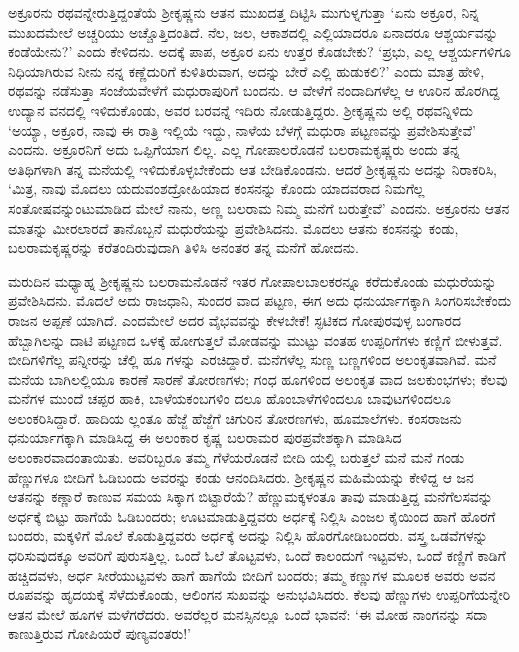 ಅಕ್ರೂರನು ರಥವನ್ನೇರುತ್ತಿದ್ದಂತೆಯೆ ಶ್ರೀಕೃಷ್ಣನು ಆತನ ಮುಖದತ್ತ ದಿಟ್ಟಿಸಿ ಮುಗುಳ್ನಗುತ್ತಾ ‘ಏನು ಅಕ್ರೂರ, ನಿನ್ನ ಮುಖದಮೇಲೆ ಅಚ್ಚರಿಯು ಅಚ್ಚೊತ್ತಿದಂತಿದೆ. ನೆಲ, ಜಲ, ಆಕಾಶದಲ್ಲಿ ಎಲ್ಲಿಯಾದರೂ ಏನಾದರೂ ಆಶ್ಚರ್ಯವನ್ನು ಕಂಡೆಯೇನು?’ ಎಂದು ಕೇಳಿದನು. ಅದಕ್ಕೆ ಪಾಪ, ಅಕ್ರೂರ ಏನು ಉತ್ತರ ಕೊಡಬೇಕು? ‘ಪ್ರಭು, ಎಲ್ಲ ಆಶ್ಚರ್ಯಗಳಿಗೂ ನಿಧಿಯಾಗಿರುವ ನೀನು ನನ್ನ ಕಣ್ಣೆದುರಿಗೆ ಕುಳಿತಿರುವಾಗ, ಅದನ್ನು ಬೇರೆ ಎಲ್ಲಿ ಹುಡುಕಲಿ?’ ಎಂದು ಮಾತ್ರ ಹೇಳಿ, ರಥವನ್ನು ನಡೆಸುತ್ತಾ ಸಂಜೆಯವೇಳೆಗೆ ಮಧುರಾಪುರಿಗೆ ಬಂದನು. ಆ ವೇಳೆಗೆ ನಂದಾದಿಗಳೆಲ್ಲ ಆ ಊರಿನ ಹೊರಗಿದ್ದ ಉದ್ಯಾನ ವನದಲ್ಲಿ ಇಳಿದುಕೊಂಡು, ಅವರ ಬರವನ್ನೆ ಇದಿರು ನೋಡುತ್ತಿದ್ದರು. ಶ್ರೀಕೃಷ್ಣನು ಅಲ್ಲಿ ರಥವನ್ನಿಳಿದು ‘ಅಯ್ಯಾ, ಅಕ್ರೂರ, ನಾವು ಈ ರಾತ್ರಿ ಇಲ್ಲಿಯೆ ಇದ್ದು, ನಾಳೆಯ ಬೆಳಗ್ಗೆ ಮಧುರಾ ಪಟ್ಟಣವನ್ನು ಪ್ರವೇಶಿಸುತ್ತೇವೆ’ ಎಂದನು. ಅಕ್ರೂರನಿಗೆ ಅದು ಒಪ್ಪಿಗೆಯಾಗ ಲಿಲ್ಲ. ಎಲ್ಲ ಗೋಪಾಲರೊಡನೆ ಬಲರಾಮಕೃಷ್ಣರು ಅಂದು ತನ್ನ ಅತಿಥಿಗಳಾಗಿ ತನ್ನ ಮನೆಯಲ್ಲಿ ಇಳಿದುಕೊಳ್ಳಬೇಕೆಂದು ಆತ ಬೇಡಿಕೊಂಡನು. ಆದರೆ ಶ್ರೀಕೃಷ್ಣನು ಅದನ್ನು ನಿರಾಕರಿಸಿ, ‘ಮಿತ್ರ, ನಾವು ಮೊದಲು ಯದುವಂಶದ್ರೋಹಿಯಾದ ಕಂಸನನ್ನು ಕೊಂದು ಯಾದವರಾದ ನಿಮಗೆಲ್ಲ ಸಂತೋಷವನ್ನುಂಟುಮಾಡಿದ ಮೇಲೆ ನಾನು, ಅಣ್ಣ ಬಲರಾಮ ನಿಮ್ಮ ಮನೆಗೆ ಬರುತ್ತೇವೆ’ ಎಂದನು. ಅಕ್ರೂರನು ಆತನ ಮಾತನ್ನು ಮೀರಲಾರದೆ ತಾನೊಬ್ಬನೆ ಮಧುರೆಯನ್ನು ಪ್ರವೇಶಿಸಿದನು. ಮೊದಲು ಆತನು ಕಂಸನನ್ನು ಕಂಡು, ಬಲರಾಮಕೃಷ್ಣರನ್ನು ಕರೆತಂದಿರುವುದಾಗಿ ತಿಳಿಸಿ ಅನಂತರ ತನ್ನ ಮನೆಗೆ ಹೋದನು.

ಮರುದಿನ ಮಧ್ಯಾಹ್ನ ಶ್ರೀಕೃಷ್ಣನು ಬಲರಾಮನೊಡನೆ ಇತರ ಗೋಪಾಲಬಾಲಕರನ್ನೂ ಕರೆದುಕೊಂಡು ಮಧುರೆಯನ್ನು ಪ್ರವೇಶಿಸಿದನು. ಮೊದಲೆ ಅದು ರಾಜಧಾನಿ, ಸುಂದರ ವಾದ ಪಟ್ಟಣ, ಈಗ ಅದು ಧನುರ್ಯಾಗಕ್ಕಾಗಿ ಸಿಂಗರಿಸಬೇಕೆಂದು ರಾಜನ ಅಪ್ಪಣೆ ಯಾಗಿದೆ. ಎಂದಮೇಲೆ ಅದರ ವೈಭವವನ್ನು ಕೇಳಬೇಕೆ! ಸ್ಫಟಿಕದ ಗೋಪುರವುಳ್ಳ ಬಂಗಾರದ ಹೆಬ್ಬಾಗಿಲನ್ನು ದಾಟಿ ಪಟ್ಟಣದ ಒಳಕ್ಕೆ ಹೋಗುತ್ತಲೆ ಮೋಡವನ್ನು ಮುಟ್ಟು ವಂತಹ ಉಪ್ಪರಿಗೆಗಳು ಕಣ್ಣಿಗೆ ಬೀಳುತ್ತವೆ. ಬೀದಿಗಳಿಗೆಲ್ಲ ಪನ್ನೀರನ್ನು ಚೆಲ್ಲಿ ಹೂ ಗಳನ್ನು ಎರಚಿದ್ದಾರೆ. ಮನೆಗಳೆಲ್ಲ ಸುಣ್ಣ ಬಣ್ಣಗಳಿಂದ ಅಲಂಕೃತವಾಗಿವೆ. ಮನೆ ಮನೆಯ ಬಾಗಿಲಲ್ಲಿಯೂ ಕಾರಣೆ ಸಾರಣೆ ತೋರಣಗಳು; ಗಂಧ ಹೂಗಳಿಂದ ಅಲಂಕೃತ ವಾದ ಜಲಕುಂಭಗಳು; ಕೆಲವು ಮನೆಗಳ ಮುಂದೆ ಚಪ್ಪರ ಹಾಕಿ, ಬಾಳೆಯಕಂಬಗಳಿಂ ದಲೂ ಹೊಂಬಾಳೆಗಳಿಂದಲೂ ಬಾವುಟಗಳಿಂದಲೂ ಅಲಂಕರಿಸಿದ್ದಾರೆ. ಹಾದಿಯ ಲ್ಲಂತೂ ಹೆಜ್ಜೆ ಹೆಜ್ಜೆಗೆ ಚಿಗುರಿನ ತೋರಣಗಳು, ಹೂಮಾಲೆಗಳು. ಕಂಸರಾಜನು ಧನುರ್ಯಾಗಕ್ಕಾಗಿ ಮಾಡಿಸಿದ್ದ ಈ ಅಲಂಕಾರ ಕೃಷ್ಣ ಬಲರಾಮರ ಪುರಪ್ರವೇಶಕ್ಕಾಗಿ ಮಾಡಿಸಿದ ಅಲಂಕಾರವಾದಂತಾಯಿತು. ಅವರಿಬ್ಬರೂ ತಮ್ಮ ಗೆಳೆಯರೊಡನೆ ಬೀದಿ ಯಲ್ಲಿ ಬರುತ್ತಲೆ ಮನೆ ಮನೆ ಗಂಡು ಹೆಣ್ಣುಗಳೂ ಬೀದಿಗೆ ಓಡಿಬಂದು ಅವರನ್ನು ಕಂಡು ಆನಂದಿಸಿದರು. ಶ್ರೀಕೃಷ್ಣನ ಮಹಿಮೆಯನ್ನು ಕೇಳಿದ್ದ ಆ ಜನ ಆತನನ್ನು ಕಣ್ಣಾರೆ ಕಾಣುವ ಸಮಯ ಸಿಕ್ಕಾಗ ಬಿಟ್ಟಾರೆಯೆ? ಹೆಣ್ಣುಮಕ್ಕಳಂತೂ ತಾವು ಮಾಡುತ್ತಿದ್ದ ಮನೆಗೆಲಸವನ್ನು ಅರ್ಧಕ್ಕೆ ಬಿಟ್ಟು ಹಾಗೆಯೆ ಓಡಿಬಂದರು; ಊಟಮಾಡುತ್ತಿದ್ದವರು ಅರ್ಧಕ್ಕೆ ನಿಲ್ಲಿಸಿ ಎಂಜಲ ಕೈಯಿಂದ ಹಾಗೆ ಹೊರಗೆ ಬಂದರು, ಮಕ್ಕಳಿಗೆ ಮೊಲೆ ಕೊಡುತ್ತಿದ್ದವರು ಅರ್ಧಕ್ಕೆ ಅದನ್ನು ನಿಲ್ಲಿಸಿ ಹೊರಗೋಡಿಬಂದರು. ವಸ್ತ್ರ ಒಡವೆಗಳನ್ನು ಧರಿಸುವುದಕ್ಕೂ ಅವರಿಗೆ ಪುರುಸತ್ತಿಲ್ಲ. ಒಂದೆ ಓಲೆ ತೊಟ್ಟವಳು, ಒಂದೆ ಕಾಲಂದುಗೆ ಇಟ್ಟವಳು, ಒಂದೆ ಕಣ್ಣಿಗೆ ಕಾಡಿಗೆ ಹಚ್ಚಿದವಳು, ಅರ್ಧ ಸೀರೆಯುಟ್ಟವಳು ಹಾಗೆ ಹಾಗೆಯೆ ಬೀದಿಗೆ ಬಂದರು; ತಮ್ಮ ಕಣ್ಣುಗಳ ಮೂಲಕ ಅವರು ಅವನ ರೂಪವನ್ನು ಹೃದಯಕ್ಕೆ ಸೆಳೆದುಕೊಂಡು, ಆಲಿಂಗನ ಸುಖವನ್ನು ಅನುಭವಿಸಿದರು. ಕೆಲವು ಹೆಣ್ಣುಗಳು ಉಪ್ಪರಿಗೆಯನ್ನೇರಿ ಆತನ ಮೇಲೆ ಹೂಗಳ ಮಳೆಗರೆದರು. ಅವರೆಲ್ಲರ ಮನಸ್ಸಿನಲ್ಲೂ ಒಂದೆ ಭಾವನೆ: ‘ಈ ಮೋಹ ನಾಂಗನನ್ನು ಸದಾ ಕಾಣುತ್ತಿರುವ ಗೋಪಿಯರೆ ಪುಣ್ಯವಂತರು!’

